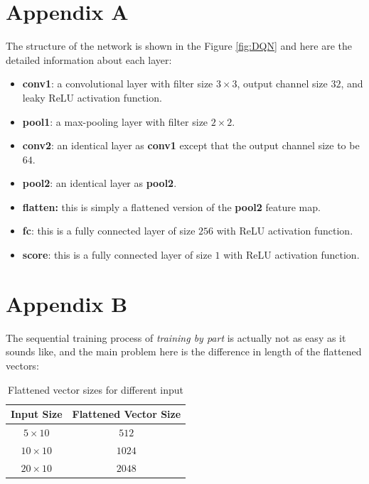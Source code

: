 \documentclass[letterpaper]{article} %
\begin{document}
\section{Appendix A}

The structure of the network is shown in the Figure \ref{fig:DQN} and here are the detailed information about each layer:

\begin{itemize}
  \item 
  {\bf conv1}: a convolutional layer with filter size $3\times 3$, output channel size $32$, and leaky ReLU activation function.
  \item 
  {\bf pool1}: a max-pooling layer with filter size $2\times 2$.
  \item 
  {\bf conv2}: an identical layer as {\bf conv1} except that the output channel size to be $64$.
  \item 
  {\bf pool2}: an identical layer as {\bf pool2}.  
  \item 
  {\bf flatten:} this is simply a flattened version of the {\bf pool2} feature map.
  \item 
  {\bf fc}: this is a fully connected layer of size $256$ with ReLU activation function.
  \item 
  {\bf score}: this is a fully connected layer of size $1$ with ReLU activation function.
\end{itemize}

\newpage
\section{Appendix B}

  The sequential training process of \textit{training by part} is actually not as easy as it sounds like, and the main problem here is the difference in length of the flattened vectors:

  \begin{table}[h!]
    \centering
    \normalsize{
      \begin{tabular}{ |c|c| } 
        \hline
        Input Size & Flattened Vector Size  \\ 
        \hline
          $5\times 10$ & $512$  \\ 
          \hline
          $10\times 10$ & $1024$  \\ 
          \hline
          $20\times 10$ & $2048$  \\
          \hline
        \end{tabular}}
    \caption{Flattened vector sizes for different input}
    \label{tab:vectorSize}
  \end{table} 
\end{document}
